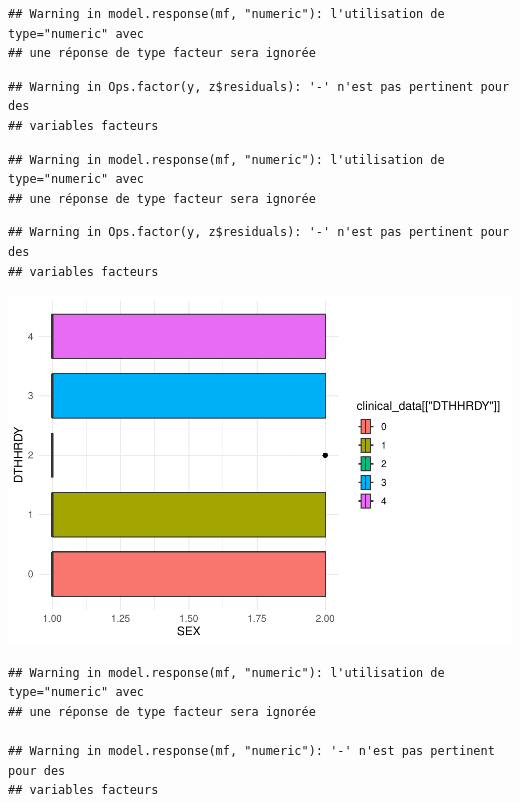 \documentclass[
]{article}
\begin{document}
\begin{verbatim}
## Warning in model.response(mf, "numeric"): l'utilisation de type="numeric" avec
## une réponse de type facteur sera ignorée
\end{verbatim}

\begin{verbatim}
## Warning in Ops.factor(y, z$residuals): '-' n'est pas pertinent pour des
## variables facteurs
\end{verbatim}

\begin{verbatim}
## Warning in model.response(mf, "numeric"): l'utilisation de type="numeric" avec
## une réponse de type facteur sera ignorée
\end{verbatim}

\begin{verbatim}
## Warning in Ops.factor(y, z$residuals): '-' n'est pas pertinent pour des
## variables facteurs
\end{verbatim}

\includegraphics{Q1_markdown_files/figure-latex/unnamed-chunk-8-7.pdf}

\begin{verbatim}
## Warning in model.response(mf, "numeric"): l'utilisation de type="numeric" avec
## une réponse de type facteur sera ignorée

## Warning in model.response(mf, "numeric"): '-' n'est pas pertinent pour des
## variables facteurs
\end{verbatim}
\end{document}
